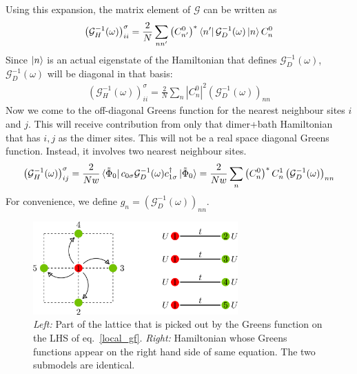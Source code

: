 \documentclass{report}
\numberwithin{equation}{section}
\begin{document}
Using this expansion, the matrix element of $\mathcal{G}$ can be written as
\begin{equation}\begin{aligned}
	\left(\mathcal{G}_{H}^{-1}(\omega)\right)_{ii}^\sigma = \frac{2}{N}\sum_{nn^\prime} \left(C^0_{n^\prime}\right)^*\bra{n^\prime}\mathcal{G}_{D}^{-1}(\omega)\ket{n} C^0_{n}
\end{aligned}\end{equation}
Since $\ket{n}$ is an actual eigenstate of the Hamiltonian that defines \(\mathcal{G}_{D}^{-1}(\omega)\), $\mathcal{G}_{D}^{-1}(\omega)$ will be diagonal in that basis:
\begin{equation}\begin{aligned}
	\left(\mathcal{G}_{H}^{-1}(\omega)\right)_{ii}^\sigma = \frac{2}{N}\sum_{n} |C^0_{n}|^2 \left(\mathcal{G}_{D}^{-1}(\omega)\right)_{n n} 
\end{aligned}\end{equation}
Now we come to the off-diagonal Greens function for the nearest neighbour sites $i$ and $j$. This will receive contribution from only that dimer+bath Hamiltonian that has \(i,j\) as the dimer sites. This will not be a real space diagonal Greens function. Instead, it involves two nearest neighbour sites. %
\begin{gather}
\label{nn_gf}
\left(\mathcal{G}_{H}^{-1}(\omega)\right)_{ij}^\sigma = \frac{2}{Nw}\bra{\tilde \Phi_0}c_{0\sigma}\mathcal{G}_{D}^{-1}(\omega)c^\dagger_{1\sigma}\ket{\tilde \Phi_0} = \frac{2}{Nw}\sum_{n} \left(C^0_{n}\right)^* C^1_{n} \left(\mathcal{G}_{D}^{-1}(\omega)\right)_{nn} 
\end{gather}
For convenience, we define $g_n = \left(\mathcal{G}_{D}^{-1}(\omega)\right)_{nn}$.
\begin{figure}[htpb!]
	\centering
	\hspace*{\fill}
	\includegraphics[width=0.7\textwidth]{../figures/lattice.png}
	\hspace*{\fill}
	\caption{\textit{Left:} Part of the lattice that is picked out by the Greens function on the LHS of eq.~\ref{local_gf}. \textit{Right:} Hamiltonian whose Greens functions appear on the right hand side of same equation. The two submodels are identical.}
\end{figure}
\end{document}
